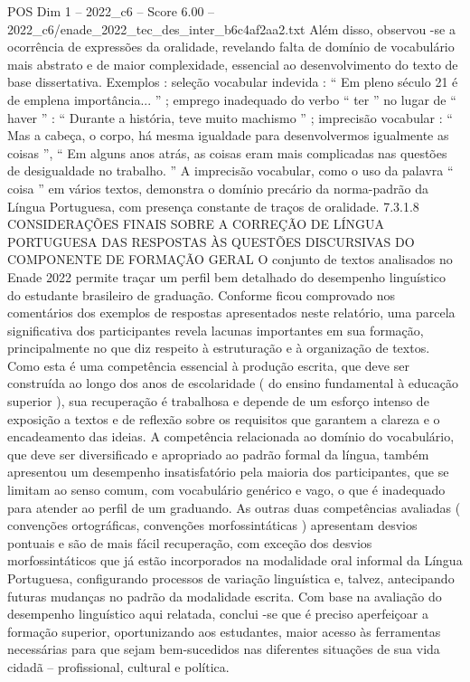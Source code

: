\begin{textsample}{POS Dim 1 – 2022\_c6 – Score 6.00 – 2022\_c6/enade\_2022\_tec\_des\_inter\_b6c4af2aa2.txt}
Além disso, observou -se a ocorrência de expressões da oralidade, revelando falta de domínio de vocabulário mais abstrato e de maior complexidade, essencial ao desenvolvimento do texto de base dissertativa.
Exemplos : seleção vocabular indevida : “ Em pleno século 21 é de emplena importância... ” ; emprego inadequado do verbo “ ter ” no lugar de “ haver ” : “ Durante a história, teve muito machismo ” ; imprecisão vocabular : “ Mas a cabeça, o corpo, há mesma igualdade para desenvolvermos igualmente as coisas ”, “ Em alguns anos atrás, as coisas eram mais complicadas nas questões de desigualdade no trabalho. ” A imprecisão vocabular, como o uso da palavra “ coisa ” em vários textos, demonstra o domínio precário da norma-padrão da Língua Portuguesa, com presença constante de traços de oralidade. 7.3.1.8 CONSIDERAÇÕES FINAIS SOBRE A CORREÇÃO DE LÍNGUA PORTUGUESA DAS RESPOSTAS ÀS QUESTÕES DISCURSIVAS DO COMPONENTE DE FORMAÇÃO GERAL O conjunto de textos analisados no Enade 2022 permite traçar um perfil bem detalhado do desempenho linguístico do estudante brasileiro de graduação.
Conforme ficou comprovado nos comentários dos exemplos de respostas apresentados neste relatório, uma parcela significativa dos participantes revela lacunas importantes em sua formação, principalmente no que diz respeito à estruturação e à organização de textos.
Como esta é uma competência essencial à produção escrita, que deve ser construída ao longo dos anos de escolaridade ( do ensino fundamental à educação superior ), sua recuperação é trabalhosa e depende de um esforço intenso de exposição a textos e de reflexão sobre os requisitos que garantem a clareza e o encadeamento das ideias.
A competência relacionada ao domínio do vocabulário, que deve ser diversificado e apropriado ao padrão formal da língua, também apresentou um desempenho insatisfatório pela maioria dos participantes, que se limitam ao senso comum, com vocabulário genérico e vago, o que é inadequado para atender ao perfil de um graduando.
As outras duas competências avaliadas ( convenções ortográficas, convenções morfossintáticas ) apresentam desvios pontuais e são de mais fácil recuperação, com exceção dos desvios morfossintáticos que já estão incorporados na modalidade oral informal da Língua Portuguesa, configurando processos de variação linguística e, talvez, antecipando futuras mudanças no padrão da modalidade escrita.
Com base na avaliação do desempenho linguístico aqui relatada, conclui -se que é preciso aperfeiçoar a formação superior, oportunizando aos estudantes, maior acesso às ferramentas necessárias para que sejam bem-sucedidos nas diferentes situações de sua vida cidadã – profissional, cultural e política.

\end{textsample}
